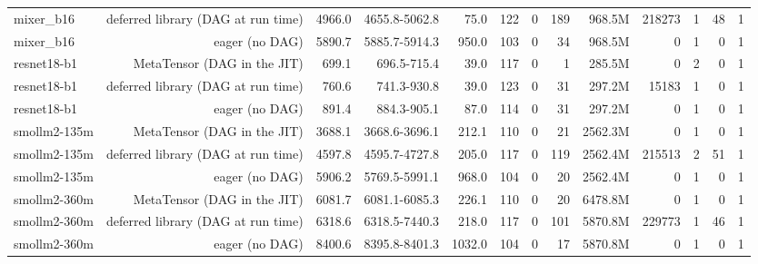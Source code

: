 \begin{tabular}{lrrrrrrrrrrrr}
mixer\_b16 & deferred library (DAG at run time) & 4966.0 & 4655.8-5062.8 & 75.0 & 122 & 0 & 189 & 968.5M & 218273 & 1 & 48 & 1 \\
mixer\_b16 & eager (no DAG) & 5890.7 & 5885.7-5914.3 & 950.0 & 103 & 0 & 34 & 968.5M & 0 & 1 & 0 & 1 \\
resnet18-b1 & MetaTensor (DAG in the JIT) & 699.1 & 696.5-715.4 & 39.0 & 117 & 0 & 1 & 285.5M & 0 & 2 & 0 & 1 \\
resnet18-b1 & deferred library (DAG at run time) & 760.6 & 741.3-930.8 & 39.0 & 123 & 0 & 31 & 297.2M & 15183 & 1 & 0 & 1 \\
resnet18-b1 & eager (no DAG) & 891.4 & 884.3-905.1 & 87.0 & 114 & 0 & 31 & 297.2M & 0 & 1 & 0 & 1 \\
smollm2-135m & MetaTensor (DAG in the JIT) & 3688.1 & 3668.6-3696.1 & 212.1 & 110 & 0 & 21 & 2562.3M & 0 & 1 & 0 & 1 \\
smollm2-135m & deferred library (DAG at run time) & 4597.8 & 4595.7-4727.8 & 205.0 & 117 & 0 & 119 & 2562.4M & 215513 & 2 & 51 & 1 \\
smollm2-135m & eager (no DAG) & 5906.2 & 5769.5-5991.1 & 968.0 & 104 & 0 & 20 & 2562.4M & 0 & 1 & 0 & 1 \\
smollm2-360m & MetaTensor (DAG in the JIT) & 6081.7 & 6081.1-6085.3 & 226.1 & 110 & 0 & 20 & 6478.8M & 0 & 1 & 0 & 1 \\
smollm2-360m & deferred library (DAG at run time) & 6318.6 & 6318.5-7440.3 & 218.0 & 117 & 0 & 101 & 5870.8M & 229773 & 1 & 46 & 1 \\
smollm2-360m & eager (no DAG) & 8400.6 & 8395.8-8401.3 & 1032.0 & 104 & 0 & 17 & 5870.8M & 0 & 1 & 0 & 1 \\
\bottomrule
\end{tabular}
